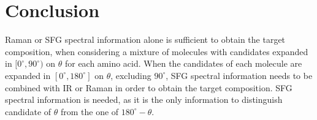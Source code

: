 \section{Conclusion}
Raman or SFG spectral information alone is sufficient to obtain the target composition, when considering a mixture of molecules with candidates expanded in $[0^{\circ}, 90^{\circ})$ on $\theta$ for each amino acid. When the candidates of each molecule are expanded in $[0^{\circ}, 180^{\circ}]$ on $\theta$, excluding $90^{\circ}$, SFG spectral information needs to be combined with IR or Raman in order to obtain the target composition. SFG spectral information is needed, as it is the only information to distinguish candidate of $\theta$ from the one of $180^{\circ}-\theta$.\\
